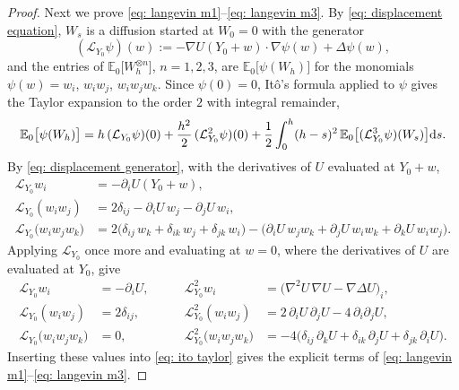 \begin{proof}
    Next we prove \eqref{eq: langevin m1}--\eqref{eq: langevin m3}. By \eqref{eq: displacement equation}, $W_s$ is a diffusion started at $W_0 = 0$ with the generator
    \begin{equation}
        (\mathcal L_{Y_0} \psi)(w) := -\nabla U(Y_0 + w) \cdot \nabla \psi(w) + \Delta \psi(w) ,
        \label{eq: displacement generator}
    \end{equation}
    and the entries of $\mathbb E_0\bigl[ W_h^{\otimes n} \bigr]$, $n = 1, 2, 3$, are $\mathbb E_0\bigl[ \psi(W_h) \bigr]$ for the monomials $\psi(w) = w_i$, $w_i w_j$, $w_i w_j w_k$. Since $\psi(0) = 0$, It\^o's formula applied to $\psi$ gives the Taylor expansion to the order $2$ with integral remainder,
    \begin{equation}
        \mathbb E_0\bigl[ \psi(W_h) \bigr] = h\, (\mathcal L_{Y_0}\psi)(0) + \frac{h^2}{2}\, (\mathcal L_{Y_0}^2\psi)(0)
        + \frac12 \int_0^h (h-s)^2\, \mathbb E_0\bigl[ (\mathcal L_{Y_0}^3 \psi)(W_s) \bigr] \mathrm{d} s .
        \label{eq: ito taylor}
    \end{equation}
    By \eqref{eq: displacement generator}, with the derivatives of $U$ evaluated at $Y_0 + w$,
    \begin{equation*}
    \begin{aligned}
        \mathcal L_{Y_0} w_i &= -\partial_i U(Y_0 + w) , \\
        \mathcal L_{Y_0}(w_i w_j) &= 2\delta_{ij} - \partial_i U\, w_j - \partial_j U\, w_i , \\
        \mathcal L_{Y_0}\bigl( w_i w_j w_k \bigr) &= 2 \bigl( \delta_{ij}\, w_k + \delta_{ik}\, w_j + \delta_{jk}\, w_i \bigr) - \bigl( \partial_i U\, w_j w_k + \partial_j U\, w_i w_k + \partial_k U\, w_i w_j \bigr) .
    \end{aligned}
    \end{equation*}
    Applying $\mathcal L_{Y_0}$ once more and evaluating at $w = 0$, where the derivatives of $U$ are evaluated at $Y_0$, give
    \begin{equation*}
    \begin{aligned}
        \mathcal L_{Y_0} w_i &= -\partial_i U , & \qquad
        \mathcal L_{Y_0}^2 w_i &= \bigl( \nabla^2 U\, \nabla U - \nabla \Delta U \bigr)_i , \\
        \mathcal L_{Y_0}(w_i w_j) &= 2\delta_{ij} , & \qquad
        \mathcal L_{Y_0}^2(w_i w_j) &= 2\, \partial_i U\, \partial_j U - 4\, \partial_i \partial_j U , \\
        \mathcal L_{Y_0}\bigl( w_i w_j w_k \bigr) &= 0 , & \qquad
        \mathcal L_{Y_0}^2\bigl( w_i w_j w_k \bigr) &= -4 \bigl( \delta_{ij}\, \partial_k U + \delta_{ik}\, \partial_j U + \delta_{jk}\, \partial_i U \bigr) .
    \end{aligned}
    \end{equation*}
    Inserting these values into \eqref{eq: ito taylor} gives the explicit terms of \eqref{eq: langevin m1}--\eqref{eq: langevin m3}.


\end{proof}
